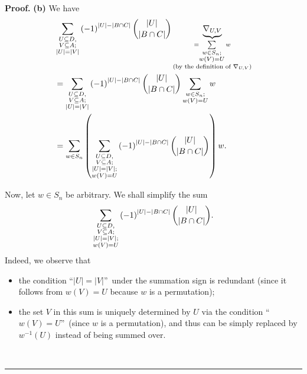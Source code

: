 \documentclass[numbers=enddot,12pt,final,onecolumn,notitlepage]{scrartcl}%
\numberwithin{exer}{subsection}
\theoremstyle{definition}
\newenvironment{proof}[1][Proof]{\noindent\textbf{#1.} }{\ \rule{0.5em}{0.5em}}
\let\sumnonlimits\sum
\renewcommand{\sum}{\sumnonlimits\limits}
\begin{document}
\begin{proof}
\textbf{(b)} We have%
\begin{align}
&  \sum_{\substack{U\subseteq D,\\V\subseteq A;\\\left\vert U\right\vert
=\left\vert V\right\vert }}\left(  -1\right)  ^{\left\vert U\right\vert
-\left\vert B\cap C\right\vert }\dbinom{\left\vert U\right\vert }{\left\vert
B\cap C\right\vert }\underbrace{\nabla_{U,V}}_{\substack{=\sum_{\substack{w\in
S_{n};\\w\left(  V\right)  =U}}w\\\text{(by the definition of }\nabla
_{U,V}\text{)}}}\nonumber\\
&  =\sum_{\substack{U\subseteq D,\\V\subseteq A;\\\left\vert U\right\vert
=\left\vert V\right\vert }}\left(  -1\right)  ^{\left\vert U\right\vert
-\left\vert B\cap C\right\vert }\dbinom{\left\vert U\right\vert }{\left\vert
B\cap C\right\vert }\sum_{\substack{w\in S_{n};\\w\left(  V\right)
=U}}w\nonumber\\
&  =\sum_{w\in S_{n}}\left(  \sum_{\substack{U\subseteq D,\\V\subseteq
A;\\\left\vert U\right\vert =\left\vert V\right\vert ;\\w\left(  V\right)
=U}}\left(  -1\right)  ^{\left\vert U\right\vert -\left\vert B\cap
C\right\vert }\dbinom{\left\vert U\right\vert }{\left\vert B\cap C\right\vert
}\right)  w. \label{pf.thm.Nabla.prod0.c.1}%
\end{align}


Now, let $w\in S_{n}$ be arbitrary. We shall simplify the sum%
\[
\sum_{\substack{U\subseteq D,\\V\subseteq A;\\\left\vert U\right\vert
=\left\vert V\right\vert ;\\w\left(  V\right)  =U}}\left(  -1\right)
^{\left\vert U\right\vert -\left\vert B\cap C\right\vert }\dbinom{\left\vert
U\right\vert }{\left\vert B\cap C\right\vert }.
\]
Indeed, we observe that

\begin{itemize}
\item the condition \textquotedblleft$\left\vert U\right\vert =\left\vert
V\right\vert $\textquotedblright\ under the summation sign is redundant (since
it follows from $w\left(  V\right)  =U$ because $w$ is a permutation);

\item the set $V$ in this sum is uniquely determined by $U$ via the condition
\textquotedblleft$w\left(  V\right)  =U$\textquotedblright\ (since $w$ is a
permutation), and thus can be simply replaced by $w^{-1}\left(  U\right)  $
instead of being summed over.
\end{itemize}


\end{proof}
\end{document}
